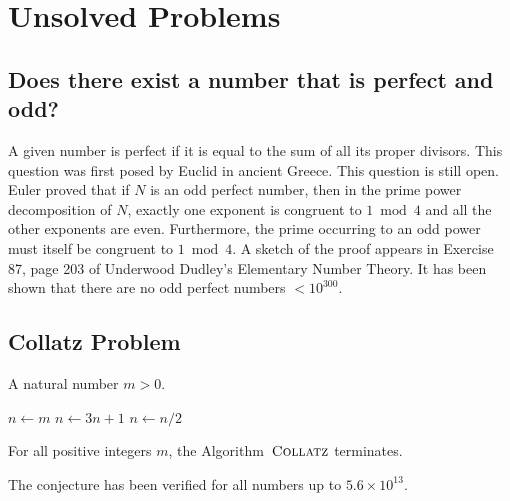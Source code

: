 \section{Unsolved Problems}

\subsection{Does there exist a number that is perfect and odd?}

A given number is perfect if it is equal to the sum of all its proper
divisors. This question was first posed by Euclid in ancient Greece.
This question is still open.  Euler proved that if $N$ is an odd perfect
number, then in the prime power decomposition of $N$, exactly one
exponent is congruent to $1 \bmod 4$ and all the other exponents are
even. Furthermore, the prime occurring to an odd power must itself be
congruent to $1 \bmod 4$.  A sketch of the proof appears in Exercise 87,
page 203 of Underwood Dudley's Elementary Number Theory.  It has been
shown that there are no odd perfect numbers $< 10^{300}$.

\subsection{Collatz Problem}

\newcommand{\collatz}{\ensuremath{\mbox{\sc Collatz}}}
\begin{algorithm}[H]
  \caption{$\collatz(n)$}\label{alg:collatz}
  \begin{algorithmic}[1]

    \REQUIRE A natural number $m > 0$.

    \smallskip

    \STATE $n \leftarrow m$
    \REPEAT
            \STATE $n \leftarrow 3n + 1$
        \ELSE
            \STATE $n \leftarrow n/2$
        \ENDIF
  \end{algorithmic}
\end{algorithm}

\begin{conj}
  For all positive integers $m$, the Algorithm~\collatz{} terminates.
\end{conj}

The conjecture has been verified for all numbers up to $5.6 \times 10^{13}$.

\Ref


